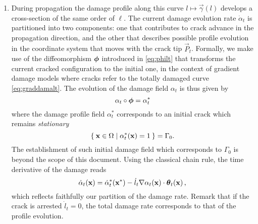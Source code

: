 \begin{hypothesis}
\begin{enumerate}
\item During propagation the damage profile along this curve $l\mapsto\vec{\gamma}(l)$ develops a cross-section of the same order of $\ell$. The current damage evolution rate $\dot{\alpha}_t$ is partitioned into two components: one that contributes to crack advance in the propagation direction, and the other that describes possible profile evolution in the coordinate system that moves with the crack tip $\vec{P}_t$. Formally, we make use of the diffeomorphism $\philt$ introduced in \eqref{eq:philt} that transforms the current cracked configuration to the initial one, in the context of gradient damage models where cracks refer to the totally damaged curve \eqref{eq:graddamalt}. The evolution of the damage field $\alpha_t$ is thus given by
\begin{equation} \label{eq:transportofdamage}
\alpha_t\circ\philt=\alpha_t^*
\end{equation}
where the damage profile field $\alpha_t^*$ corresponds to an initial crack which remains \emph{stationary}
\[
\set{\vec{x}\in\Omega|\alpha_t^*(\vec{x})=1}=\Gamma_0.
\]
The establishment of such initial damage field which corresponds to $\Gamma_0$ is beyond the scope of this document. Using the classical chain rule, the time derivative of the damage reads
\begin{equation} \label{eq:alphadot}
\dot{\alpha}_t(\vec{x})=\dot{\alpha}_t^*(\vec{x}^*)-\dot{l}_t\nabla\alpha_t(\vec{x})\cdot\vtheta_t(\vec{x})\,,
\end{equation}
which reflects faithfully our partition of the damage rate. Remark that if the crack is arrested $\dot{l}_t=0$, the total damage rate corresponds to that of the profile evolution.
\end{enumerate}
\end{hypothesis}

